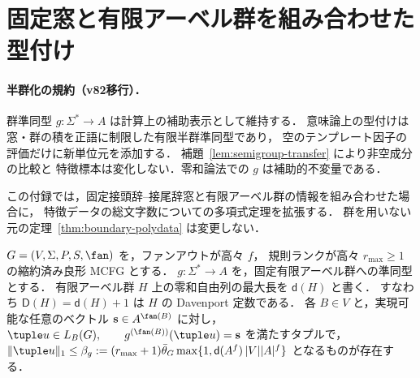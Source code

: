 \section{固定窓と有限アーベル群を組み合わせた型付け}
\label{app:window-abelian}


\paragraph{半群化の規約（v82移行）．}
群準同型 $g:\Sigma^*\to A$ は計算上の補助表示として維持する．
意味論上の型付けは窓・群の積を正語に制限した有限半群準同型であり，
空のテンプレート因子の評価だけに新単位元を添加する．
補題~\ref{lem:semigroup-transfer} により非空成分の比較と
特徴標本は変化しない．零和論法での $g$ は補助的不変量である．


この付録では，固定接頭辞--接尾辞窓と有限アーベル群の情報を組み合わせた場合に，
特徴データの総文字数についての多項式定理を拡張する．
群を用いない元の定理~\ref{thm:boundary-polydata} は変更しない．

\begin{lemma}[アーベル群値を指定した短いタプル]
\label{lem:group-typed-shortest}
$G=(V,\Sigma,P,S,\fan)$ を，ファンアウトが高々 $f$，
規則ランクが高々 $r_{\max}\ge1$ の縮約済み良形 MCFG とする．
$g:\Sigma^*\to A$ を，固定有限アーベル群への準同型とする．
有限アーベル群 $H$ 上の零和自由列の最大長を $\mathsf d(H)$ と書く．
すなわち $\mathsf D(H)=\mathsf d(H)+1$ は $H$ の Davenport 定数である．
各 $B\in V$ と，実現可能な任意のベクトル
$\mathbf s\in A^{\fan(B)}$ に対し，
\(\tuple u\in L_B(G),\qquad g^{(\fan(B))}(\tuple u)=\mathbf s\)
を満たすタプルで，
\(\|\tuple u\|_1\le\beta_g:= (r_{\max}+1)\bar\theta_G \max\{1,\mathsf d(A^f)\,|V||A|^f\}\)
となるものが存在する．
\end{lemma}

